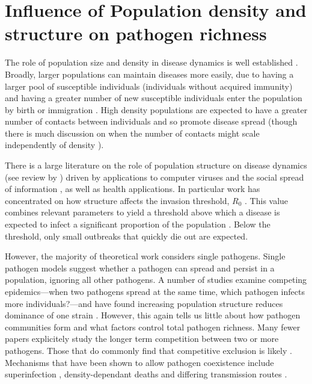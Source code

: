 \section{Influence of Population density and structure on pathogen richness}




The role of population size and density in disease dynamics is well established \cite{may1979population, anderson1979population, heesterbeek2002brief, lloyd2005should}.
Broadly, larger populations can maintain diseases more easily, due to having a larger pool of susceptible individuals (individuals without acquired immunity) and having a greater number of new susceptible individuals enter the population by birth or immigration \cite{may1979population, anderson1979population}.
High density populations are expected to have a greater number of contacts between individuals and so promote disease spread (though there is much discussion on when the number of contacts might scale independently of density \cite{mccallum2001should}).


There is a large literature on the role of population structure on disease dynamics (see review by \textcite{pastor2015epidemic}) driven by applications to computer viruses \cite{pastor2001epidemic} and the social spread of information \cite{goffman1964generalization}, as well as health applications.
In particular work has concentrated on how structure affects the invasion threshold, $R_0$ \cite{colizza2007invasion, barthelemy2010fluctuation, wu2013threshold, may2001infection, pastor2001epidemic}. 
This value combines relevant parameters to yield a threshold above which a disease is expected to infect a significant proportion of the population \cite{may1979population, anderson1979population}.
Below the threshold, only small outbreaks that quickly die out are expected.

However, the majority of theoretical work considers single pathogens.
Single pathogen models suggest whether a pathogen can spread and persist in a population, ignoring all other pathogens.
A number of studies examine competing epidemics---when two pathogens spread at the same time, which pathogen infects more individuals?---and have found increasing population structure reduces dominance of one strain \cite{van2014domination, poletto2013host, poletto2015characterising}.
However, this again tells us little about how pathogen communities form and what factors control total pathogen richness.
Many fewer papers explicitely study the longer term competition between two or more pathogens.
Those that do commonly find that competitive exclusion is likely \cite{castillo1995dynamics, bremermann1989competitive, martcheva2013competitive, ackleh2003competitive, ackleh2014robust, turner2002impact}.
Mechanisms that have been shown to allow pathogen coexistence include superinfection \cite{may1994superinfection, li2010age}, density-dependant deaths \cite{ackleh2003competitive, kirupaharan2004coexistence} and differing transmission routes \cite{allen2003dynamics}.

